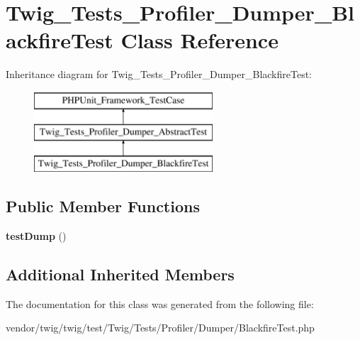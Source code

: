 \hypertarget{classTwig__Tests__Profiler__Dumper__BlackfireTest}{}\section{Twig\+\_\+\+Tests\+\_\+\+Profiler\+\_\+\+Dumper\+\_\+\+Blackfire\+Test Class Reference}
\label{classTwig__Tests__Profiler__Dumper__BlackfireTest}
Inheritance diagram for Twig\+\_\+\+Tests\+\_\+\+Profiler\+\_\+\+Dumper\+\_\+\+Blackfire\+Test\+:\begin{figure}[H]
\begin{center}
\leavevmode
\includegraphics[height=3.000000cm]{classTwig__Tests__Profiler__Dumper__BlackfireTest}
\end{center}
\end{figure}
\subsection*{Public Member Functions}
\begin{DoxyCompactItemize}
\item 
{\bfseries test\+Dump} ()\hypertarget{classTwig__Tests__Profiler__Dumper__BlackfireTest_a3a5638fe4037adc44261f7d410a46cd4}{}\label{classTwig__Tests__Profiler__Dumper__BlackfireTest_a3a5638fe4037adc44261f7d410a46cd4}

\end{DoxyCompactItemize}
\subsection*{Additional Inherited Members}


The documentation for this class was generated from the following file\+:\begin{DoxyCompactItemize}
\item 
vendor/twig/twig/test/\+Twig/\+Tests/\+Profiler/\+Dumper/Blackfire\+Test.\+php\end{DoxyCompactItemize}
